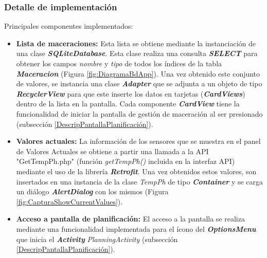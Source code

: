             \subsubsection{Detalle de implementación}
                Principales componentes implementados:
                \begin{itemize}
                    \item \textbf{Lista de maceraciones:} Esta lista se obtiene mediante la instanciación de una clase \textbf{\textit{\gls{SQLiteDatabase}}}. Esta clase realiza una consulta \textbf{\textit{\gls{SELECT}}} para obtener los campos \textit{nombre} y \textit{tipo} de todos los índices de la tabla \textbf{\textit{Maceracion}} (Figura \ref{fig:DiagramaBdApp}). Una vez obtenido este conjunto de valores, se instancia una clase \textbf{\textit{\gls{Adapter}}} que se adjunta a un objeto de tipo \textbf{\textit{\gls{RecyclerView}}} para que este inserte los datos en tarjetas (\textbf{\textit{\gls{CardView}s}}) dentro de la lista en la pantalla. Cada componente \textbf{\textit{\gls{CardView}}} tiene la funcionalidad de iniciar la pantalla de gestión de maceración al ser presionado (subsección \ref{DescripPantallaPlanificación}).
                 
                    \item \textbf{Valores actuales:} La información de los sensores que se muestra en el panel de Valores Actuales se obtiene a partir una llamada a la API "GetTempPh.php" (función \textit{getTempPh()} incluida en la interfaz API) mediante el uso de la librería \textbf{\textit{\gls{Retrofit}}}. Una vez obtenidos estos valores, son insertados en una instancia de la clase \textit{TempPh} de tipo \textbf{\textit{\gls{Container}}} y se carga un diálogo \textbf{\textit{\gls{AlertDialog}}} con los mismos (Figura \ref{fig:CapturaShowCurrentValues}).
                    
                    \item \textbf{Acceso a pantalla de planificación:} El acceso a la pantalla se realiza mediante una funcionalidad implementada para el ícono del \textbf{\textit{\gls{OptionsMenu}}} que inicia el \textbf{\textit{\gls{Activity}}} \textit{PlanningActivity} (subsección \ref{DescripPantallaPlanificación}).
                    
                \end{itemize}
                
